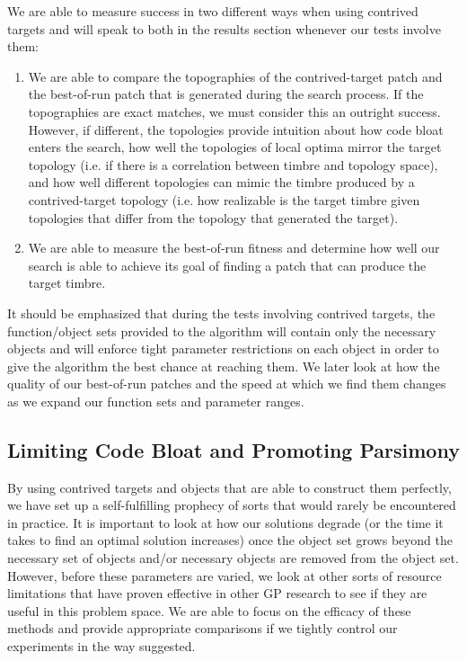 \documentclass[a4paper,12pt]{report} 	%
\numberwithin{figure}{chapter}
\numberwithin{table}{chapter}
\numberwithin{equation}{chapter}
\begin{document}
\begin{flushleft}
We are able to measure success in two different ways when using contrived targets and will speak to both in the results section whenever our tests involve them:
\begin{enumerate}
\item We are able to compare the topographies of the contrived-target patch and the best-of-run patch that is generated during the search process. If the topographies are exact matches, we must consider this an outright success. However, if different, the topologies provide intuition about how code bloat enters the search, how well the topologies of local optima mirror the target topology (i.e. if there is a correlation between timbre and topology space), and how well different topologies can mimic the timbre produced by a contrived-target topology (i.e. how realizable is the target timbre given topologies that differ from the topology that generated the target).
\item We are able to measure the best-of-run fitness and determine how well our search is able to achieve its goal of finding a patch that can produce the target timbre.
\end{enumerate}

It should be emphasized that during the tests involving contrived targets, the function/object sets provided to the algorithm will contain only the necessary objects and will enforce tight parameter restrictions on each object in order to give the algorithm the best chance at reaching them. We later look at how the quality of our best-of-run patches and the speed at which we find them changes as we expand our function sets and parameter ranges.

\subsection{Limiting Code Bloat and Promoting Parsimony}

By using contrived targets and objects that are able to construct them perfectly, we have set up a self-fulfilling prophecy of sorts that would rarely be encountered in practice. It is important to look at how our solutions degrade (or the time it takes to find an optimal solution increases) once the object set grows beyond the necessary set of objects and/or necessary objects are removed from the object set. However, before these parameters are varied, we look at other sorts of resource limitations that have proven effective in other GP research to see if they are useful in this problem space. We are able to focus on the efficacy of these methods and provide appropriate comparisons if we tightly control our experiments in the way suggested.


\end{flushleft}
\end{document}
